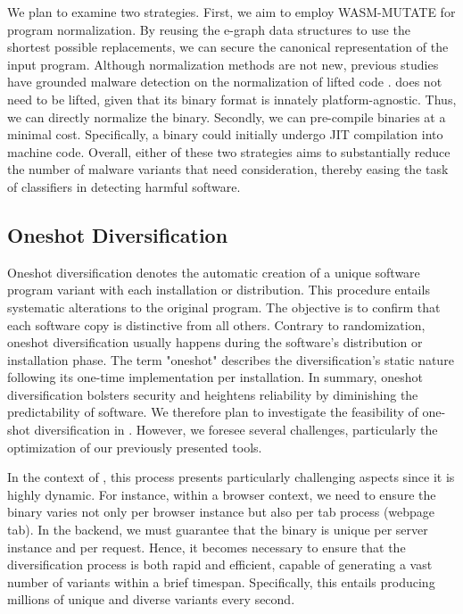 We plan to examine two strategies. 
First, we aim to employ WASM-MUTATE for program normalization. 
By reusing the e-graph data structures to use the shortest possible replacements, we can secure the canonical representation of the input program. 
Although normalization methods are not new, previous studies have grounded malware detection on the normalization of lifted code \cite{ 6234404, 10.1007/978-3-030-78120-0_5}. 
\Wasm does not need to be lifted, given that its binary format is innately platform-agnostic. 
Thus, we can directly normalize the \Wasm binary.
Secondly, we can pre-compile \Wasm binaries at a minimal cost. 
Specifically, a \Wasm binary could initially undergo JIT compilation into machine code. 
Overall, either of these two strategies aims to substantially reduce the number of malware variants that need consideration, thereby easing the task of classifiers in detecting harmful software. 



\vspace{-0.3cm}
\subsection{Oneshot Diversification}
Oneshot diversification denotes the automatic creation of a unique software program variant with each installation or distribution. 
This procedure entails systematic alterations to the original program. 
The objective is to confirm that each software copy is distinctive from all others. 
Contrary to randomization, oneshot diversification usually happens during the software's distribution or installation phase. 
The term "oneshot" describes the diversification's static nature following its one-time implementation per installation. 
In summary, oneshot diversification bolsters security and heightens reliability by diminishing the predictability of software.
We therefore plan to investigate the feasibility of one-shot diversification in \Wasm. 
However, we foresee several challenges, particularly the optimization of our previously presented tools.


In the context of \Wasm, this process presents particularly challenging aspects since it is highly dynamic.
For instance, within a browser context, we need to ensure the \Wasm binary varies not only per browser instance but also per tab process (webpage tab).
In the backend, we must guarantee that the \Wasm binary is unique per server instance and per request.
Hence, it becomes necessary to ensure that the diversification process is both rapid and efficient, capable of generating a vast number of variants within a brief timespan.
Specifically, this entails producing millions of unique and diverse variants every second.



